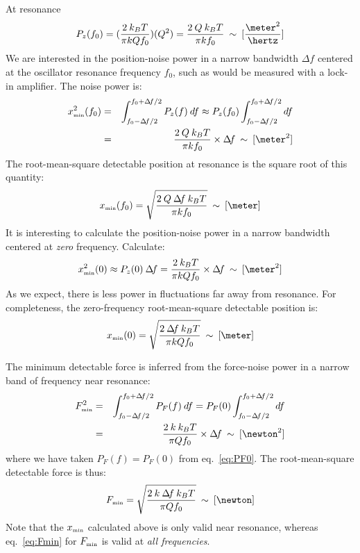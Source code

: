At resonance
\begin{equation}
P_z(f_0) = (\frac{2 \: k_B T}{\pi k Q f_0})(Q^2) = \frac{2 \: Q \: k_B T}{\pi k f_0} \: \sim \: [\frac{\meter^2}{\hertz}] 
\end{equation}
We are interested in the position-noise power in a narrow bandwidth $\Delta \!
f$ centered at the oscillator resonance frequency $f_0$, such as would
be measured with a lock-in amplifier.  The noise power is:
\begin{eqnarray*}
x_{\mbox{\tiny min}}^2(f_0) & = & \int_{f_0 - \Delta \! f / 2}^{f_0 + \Delta \! f / 2} P_z(f) \: df \approx P_z(f_0) \int_{f_0 - \Delta \! f/2}^{f_0 + \Delta \! f/2} df\\  
& = & \frac{2 \: Q \: k_B T}{\pi k f_0} \times \Delta \! f \: \sim \: [\meter^2]
\end{eqnarray*}
The root-mean-square detectable position at resonance is the square
root of this quantity:
\begin{equation}
x_{\mbox{\tiny min}}(f_0) = \sqrt{ \frac{2 \: Q \: \Delta \! f \: k_B T}{\pi k f_0} } \: \sim \: [\meter]
\end{equation}
It is interesting to calculate the position-noise power in a narrow
bandwidth centered at \emph{zero} frequency.  Calculate:
\begin{equation}
x_{\mbox{\tiny min}}^2(0) \approx P_z(0) \: \Delta \! f 
= \frac{2 \: k_B T}{\pi k Q f_0} \times \Delta \! f \: \sim \: [\meter^2]
\end{equation}
As we expect, there is less power in fluctuations far away from
resonance.  For completeness, the zero-frequency root-mean-square
detectable position is:
\begin{equation}
x_{\mbox{\tiny min}}(0) = \sqrt{ \frac{2 \: \Delta \! f \: k_B T}{\pi k Q f_0} } \: \sim \: [\meter]
\end{equation}

The minimum detectable force is inferred from the force-noise power
in a narrow band of frequency near resonance:
\begin{eqnarray*}
F_{\mbox{\tiny min}}^2 & = & \int_{f_0 - \Delta \! f / 2}^{f_0 + \Delta \! f / 2} P_F(f) \: df =  P_F(0) \int_{f_0 - \Delta \! f/2}^{f_0 + \Delta \! f/2} df\\  
& = & \frac{2 \: k \: k_B T}{\pi Q f_0} \times \Delta \! f \: \sim \: [\newton^2]
\end{eqnarray*}
where we have taken $P_F(f) = P_F(0)$ from eq.~\ref{eq:PF0}.  The
root-mean-square detectable force is thus:
\begin{equation}
F_{\mbox{\tiny min}} = \sqrt{ \frac{2 \: k \: \Delta \! f \: k_B T}{\pi Q f_0} } \: \sim \: [\newton]
\label{eq:Fmin}
\end{equation}
Note that the $x_{\mbox{\tiny min}}$ calculated above is only valid
near resonance, whereas eq.~\ref{eq:Fmin} for $F_{\mbox{\tiny min}}$ is
valid at \emph{all frequencies}.

